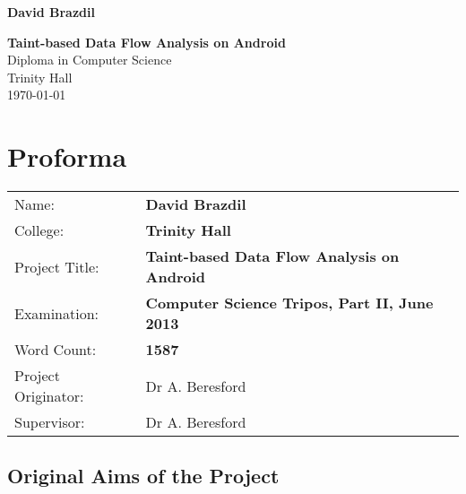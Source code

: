 \documentclass[12pt,twoside,notitlepage]{report}
\title{\strTitle}
\author{\strAuthor}
\newcommand{\strAuthor}{David Brazdil}
\newcommand{\strCollege}{Trinity Hall}
\newcommand{\strTitle}{Taint-based Data Flow Analysis on Android}
\newcommand{\strExamination}{Computer Science Tripos, Part II}
\newcommand{\strYear}{June 2013}
\newcommand{\strSupervisor}{Dr A. Beresford}
\begin{document}




\pagestyle{empty}

\hfill{\LARGE \bf \strAuthor}

\vspace*{60mm}
\begin{center}
\Huge
{\bf \strTitle} \\
\vspace*{5mm}
Diploma in Computer Science \\
\vspace*{5mm}
Trinity Hall \\
\vspace*{5mm}
\today  %
\end{center}

\cleardoublepage


\setcounter{page}{1}
\pagestyle{plain}

\chapter*{Proforma}

{\large
\begin{tabular}{ll}
Name:               & \bf \strAuthor                       \\
College:            & \bf \strCollege                     \\
Project Title:      & \bf \strTitle \\
Examination:        & \bf \strExamination, \strYear        \\
Word Count:         & \bf 1587\footnotemark[1] \\
Project Originator: & \strSupervisor                    \\
Supervisor:         & \strSupervisor                    \\ 
\end{tabular}
}


\section*{Original Aims of the Project}
\end{document}
